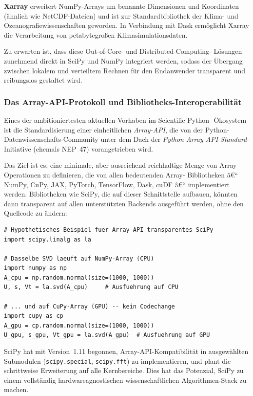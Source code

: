 \documentclass[12pt, a4paper]{article}
\begin{document}
\textbf{Xarray} erweitert NumPy-Arrays um benannte Dimensionen und
Koordinaten (ähnlich wie NetCDF-Dateien) und ist zur Standardbibliothek
der Klima- und Ozeanografiewissenschaften geworden. In Verbindung mit
Dask ermöglicht Xarray die Verarbeitung von petabytegroßen Klimasimulationsdaten.

Zu erwarten ist, dass diese Out-of-Core- und Distributed-Computing-
Lösungen zunehmend direkt in SciPy und NumPy integriert werden, sodass
der Übergang zwischen lokalem und verteiltem Rechnen für den Endanwender
transparent und reibungslos gestaltet wird.

\subsubsection{Das Array-API-Protokoll und Bibliotheks-Interoperabilität}
\label{subsubsec:array-api}

Eines der ambitioniertesten aktuellen Vorhaben im Scientific-Python-
Ökosystem ist die Standardisierung einer einheitlichen \emph{Array-API},
die von der Python-Datenwissenschafts-Community unter dem Dach der
\emph{Python Array API Standard}-Initiative (ehemals NEP~47) vorangetrieben
wird.

Das Ziel ist es, eine minimale, aber ausreichend reichhaltige Menge von
Array-Operationen zu definieren, die von allen bedeutenden Array-
Bibliotheken â€“ NumPy, CuPy, JAX, PyTorch, TensorFlow, Dask, cuDF â€“
implementiert werden. Bibliotheken wie SciPy, die auf dieser Schnittstelle
aufbauen, könnten dann transparent auf allen unterstützten Backends
ausgeführt werden, ohne den Quellcode zu ändern:

\begin{lstlisting}[caption={Array-API-kompatible SciPy-Funktion (Zukunftsvision)}]
# Hypothetisches Beispiel fuer Array-API-transparentes SciPy
import scipy.linalg as la

# Dasselbe SVD laeuft auf NumPy-Array (CPU)
import numpy as np
A_cpu = np.random.normal(size=(1000, 1000))
U, s, Vt = la.svd(A_cpu)     # Ausfuehrung auf CPU

# ... und auf CuPy-Array (GPU) -- kein Codechange
import cupy as cp
A_gpu = cp.random.normal(size=(1000, 1000))
U_gpu, s_gpu, Vt_gpu = la.svd(A_gpu)  # Ausfuehrung auf GPU
\end{lstlisting}

SciPy hat mit Version~1.11 begonnen, Array-API-Kompatibilität in
ausgewählten Submodulen (\texttt{scipy.special}, \texttt{scipy.fft})
zu implementieren, und plant die schrittweise Erweiterung auf alle
Kernbereiche. Dies hat das Potenzial, SciPy zu einem vollständig
hardwareagnostischen wissenschaftlichen Algorithmen-Stack zu machen.
\end{document}
